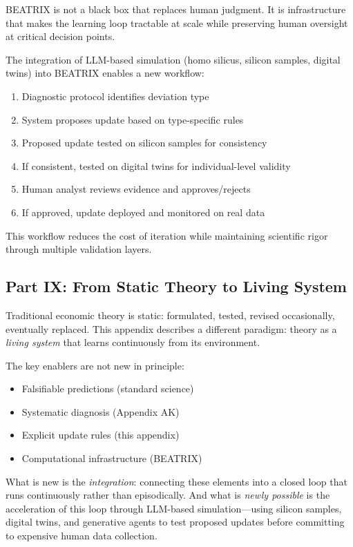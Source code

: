 BEATRIX is not a black box that replaces human judgment. It is infrastructure 
that makes the learning loop tractable at scale while preserving human oversight 
at critical decision points.

The integration of LLM-based simulation (homo silicus, silicon samples, digital 
twins) into BEATRIX enables a new workflow:
\begin{enumerate}
    \item Diagnostic protocol identifies deviation type
    \item System proposes update based on type-specific rules
    \item Proposed update tested on silicon samples for consistency
    \item If consistent, tested on digital twins for individual-level validity
    \item Human analyst reviews evidence and approves/rejects
    \item If approved, update deployed and monitored on real data
\end{enumerate}

This workflow reduces the cost of iteration while maintaining scientific rigor 
through multiple validation layers.

\subsection{Part IX: From Static Theory to Living System}

Traditional economic theory is static: formulated, tested, revised occasionally, 
eventually replaced. This appendix describes a different paradigm: theory as a 
\emph{living system} that learns continuously from its environment.

The key enablers are not new in principle:
\begin{itemize}
    \item Falsifiable predictions (standard science)
    \item Systematic diagnosis (Appendix AK)
    \item Explicit update rules (this appendix)
    \item Computational infrastructure (BEATRIX)
\end{itemize}

What is new is the \emph{integration}: connecting these elements into a 
closed loop that runs continuously rather than episodically. And what is 
\emph{newly possible} is the acceleration of this loop through LLM-based 
simulation---using silicon samples, digital twins, and generative agents to 
test proposed updates before committing to expensive human data collection.

